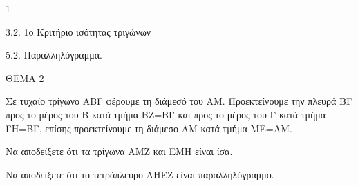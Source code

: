 \begin{ylh}{1}
    \item 3.2. 1ο Κριτήριο ισότητας τριγώνων
    \item 5.2. Παραλληλόγραμμα.
\end{ylh}

ΘΕΜΑ 2

Σε τυχαίο τρίγωνο ΑΒΓ φέρουμε τη διάμεσό του ΑΜ. Προεκτείνουμε την πλευρά ΒΓ προς το μέρος του Β κατά τμήμα ΒΖ=ΒΓ και προς το μέρος του Γ κατά τμήμα ΓΗ=ΒΓ, επίσης προεκτείνουμε τη διάμεσο ΑΜ κατά τμήμα ΜΕ=ΑΜ.

\begin{alist}
\item Να αποδείξετε ότι τα τρίγωνα ΑΜΖ και ΕΜΗ είναι ίσα. 

\item Να αποδείξετε ότι το τετράπλευρο ΑΗΕΖ είναι παραλληλόγραμμο. 
\end{alist}
